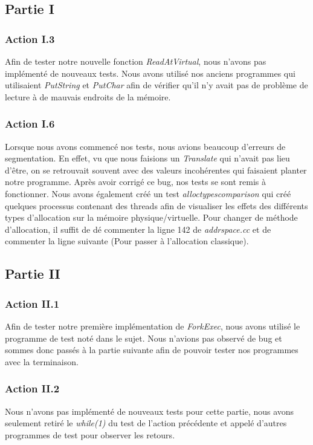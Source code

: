 \documentclass{article}
\begin{document}
\subsection{Partie I}
\subsubsection{Action I.3}
Afin de tester notre nouvelle fonction \textit{ReadAtVirtual}, nous n'avons pas implémenté de nouveaux tests. Nous avons utilisé nos anciens programmes 
qui utilisaient \textit{PutString} et \textit{PutChar} afin de vérifier qu'il n'y avait pas de problème de lecture à de mauvais endroits de la mémoire.

\subsubsection{Action I.6}
Lorsque nous avons commencé nos tests, nous avions beaucoup d'erreurs de segmentation. En effet, vu que nous faisions un \textit{Translate} qui n'avait pas lieu d'être, on se retrouvait souvent
avec des valeurs incohérentes qui faisaient planter notre programme. Après avoir corrigé ce bug, nos tests se sont remis à fonctionner. Nous avons également créé un test \textit{alloctypescomparison}
qui créé quelques processus contenant des threads afin de visualiser les effets des différents types d'allocation sur la mémoire physique/virtuelle.
Pour changer de méthode d'allocation, il suffit de dé commenter la ligne 142 de \textit{addrspace.cc} et de commenter la ligne suivante (Pour passer à l'allocation classique).

\subsection{Partie II}

\subsubsection{Action II.1}
Afin de tester notre première implémentation de \textit{ForkExec}, nous avons utilisé le programme de test noté dans le sujet.
Nous n'avions pas observé de bug et sommes donc passés à la partie suivante afin de pouvoir tester nos programmes avec la terminaison.

\subsubsection{Action II.2}
Nous n'avons pas implémenté de nouveaux tests pour cette partie, nous avons seulement retiré le \textit{while(1)} du test de 
l'action précédente et appelé d'autres programmes de test pour observer les retours.
\end{document}
